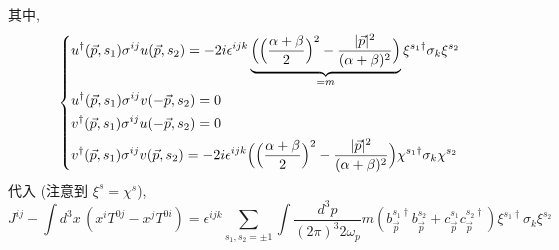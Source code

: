\begin{itemize}
\begin{tcolorbox}[title=calculation:]
		其中,
		\begin{equation}
			\begin{dcases}
				u^\dag(\vec{p}, s_1) \sigma^{i j} u(\vec{p}, s_2) = - 2 i \epsilon^{i j k} \underbrace{\Big( \Big( \frac{\alpha + \beta}{2} \Big)^2 - \frac{|\vec{p}|^2}{(\alpha + \beta)^2} \Big)}_{= m} \xi^{s_1 \dag} \sigma_k \xi^{s_2} \\
				u^\dag(\vec{p}, s_1) \sigma^{i j} v(- \vec{p}, s_2) = 0 \\
				v^\dag(\vec{p}, s_1) \sigma^{i j} u(- \vec{p}, s_2) = 0 \\
				v^\dag(\vec{p}, s_1) \sigma^{i j} v(\vec{p}, s_2) = - 2 i \epsilon^{i j k} \Big( \Big( \frac{\alpha + \beta}{2} \Big)^2 - \frac{|\vec{p}|^2}{(\alpha + \beta)^2} \Big) \chi^{s_1 \dag} \sigma_k \chi^{s_2}
			\end{dcases}
		\end{equation}
		代入 (注意到 $\xi^s = \chi^s$),
		\begin{equation}
			J^{i j} - \int d^3 x \, (x^i T^{0 j} - x^j T^{0 i}) = \epsilon^{i j k} \sum_{s_1, s_2 = \pm 1} \int \frac{d^3 p}{(2 \pi)^3 2 \omega_p} m (b^{s_1 \dag}_{\vec{p}} b^{s_2}_{\vec{p}} + c^{s_1}_{\vec{p}} c^{s_2 \dag}_{\vec{p}}) \xi^{s_1 \dag} \sigma_k \xi^{s_2}
		\end{equation}
	\end{tcolorbox}
\end{itemize}

